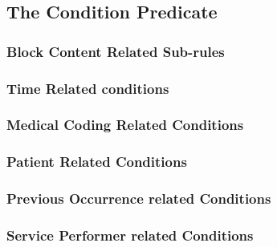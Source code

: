 \subsection{The Condition Predicate}\label{subsec:the-condition-predicate}

\subsubsection{Block Content Related Sub-rules}

\subsubsection{Time Related conditions}

\subsubsection{Medical Coding Related Conditions}

\subsubsection{Patient Related Conditions}

\subsubsection{Previous Occurrence related Conditions}

\subsubsection{Service Performer related Conditions}

